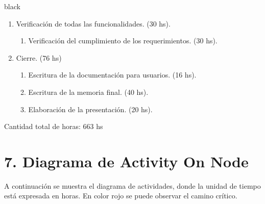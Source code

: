 \documentclass[11pt]{charter}
\begin{document}
\begin{consigna}{black}
\begin{enumerate}
\item Verificación de todas las funcionalidades. (30 hs).
	\begin{enumerate}
	\item Verificación del cumplimiento de los requerimientos.  (30 hs).
	\end{enumerate}		

\item Cierre.  (76 hs)
	\begin{enumerate}
	\item Escritura de la documentación para usuarios. (16 hs).
	\item Escritura de la memoria final. (40 hs).
	\item Elaboración de la presentación. (20 hs).
	\end{enumerate}
	
\end{enumerate}

Cantidad total de horas: 663 hs


\end{consigna}

\section{7. Diagrama de Activity On Node}
\label{sec:AoN}
A continuación se muestra el diagrama de actividades, donde la unidad de tiempo está expresada en horas.
En color rojo se puede observar el camino crítico.




\end{document}
